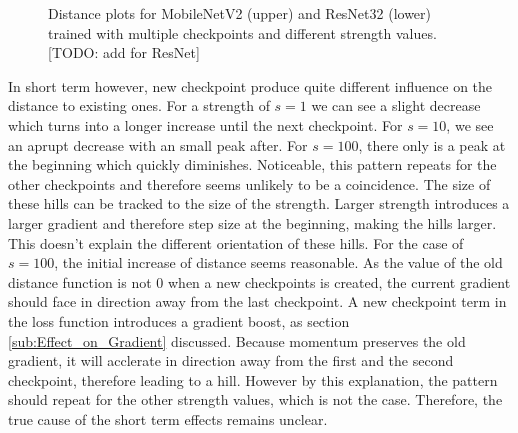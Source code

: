 \begin{figure}[h]
\begin{center}
        \caption{Distance plots for MobileNetV2 (upper) and ResNet32 (lower) trained with multiple checkpoints and different strength values. [TODO: add for ResNet]}
    \end{center}
\end{figure}

In short term however, new checkpoint produce quite different influence on the
distance to existing ones. For a strength of $s=1$ we can see a slight decrease
which turns into a longer increase until the next checkpoint. For $s=10$, we see
an aprupt decrease with an small peak after. For $s=100$, there only is a peak
at the beginning which quickly diminishes. Noticeable, this pattern repeats for
the other checkpoints and therefore seems unlikely to be a coincidence. The size
of these hills can be tracked to the size of the strength. Larger strength
introduces a larger gradient and therefore step size at the beginning, making
the hills larger. This doesn't explain the different orientation of these hills.
For the case of $s=100$, the initial increase of distance seems reasonable. As
the value of the old distance function is not 0 when a new checkpoints is
created, the current gradient should face in direction away from the last
checkpoint. A new checkpoint term in the loss function introduces a gradient
boost, as section \ref{sub:Effect_on_Gradient} discussed. Because momentum
preserves the old gradient, it will acclerate in direction away from the first
and the second checkpoint, therefore leading to a hill. However by this
explanation, the pattern should repeat for the other strength values, which is
not the case. Therefore, the true cause of the short term effects remains
unclear.


